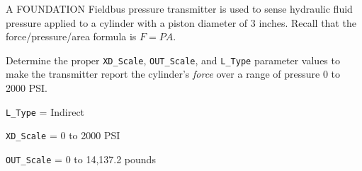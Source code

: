 

A FOUNDATION Fieldbus pressure transmitter is used to sense hydraulic fluid pressure applied to a cylinder with a piston diameter of 3 inches.  Recall that the force/pressure/area formula is $F = PA$.

\vskip 10pt

Determine the proper {\tt XD\_Scale}, {\tt OUT\_Scale}, and {\tt L\_Type} parameter values to make the transmitter report the cylinder's {\it force} over a range of pressure 0 to 2000 PSI.







{\tt L\_Type} = Indirect

\vskip 10pt

{\tt XD\_Scale} = 0 to 2000 PSI

\vskip 10pt

{\tt OUT\_Scale} = 0 to 14,137.2 pounds











